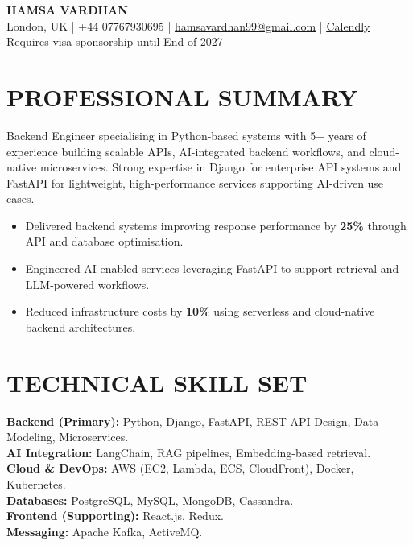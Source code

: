 \documentclass[11pt]{article}
\begin{document}
\begin{center}
{\LARGE \textbf{HAMSA VARDHAN}}\\
London, UK \;|\; +44 07767930695 \;|\;
\href{mailto:hamsavardhan99@gmail.com}{hamsavardhan99@gmail.com} \;|\; \href{https://calendly.com/hamsa-vd/intro-call}{\underline{Calendly}} \\
{\small Requires visa sponsorship until End of 2027}
\end{center}

\section*{PROFESSIONAL SUMMARY}

Backend Engineer specialising in Python-based systems with 5+ years of experience building scalable APIs, AI-integrated backend workflows, and cloud-native microservices. Strong expertise in Django for enterprise API systems and FastAPI for lightweight, high-performance services supporting AI-driven use cases.

\begin{itemize}
    \item Delivered backend systems improving response performance by \textbf{25\%} through API and database optimisation.
    \item Engineered AI-enabled services leveraging FastAPI to support retrieval and LLM-powered workflows.
    \item Reduced infrastructure costs by \textbf{10\%} using serverless and cloud-native backend architectures.
\end{itemize}

\section*{TECHNICAL SKILL SET}

\textbf{Backend (Primary):} Python, Django, FastAPI, REST API Design, Data Modeling, Microservices.\\
\textbf{AI Integration:} LangChain, RAG pipelines, Embedding-based retrieval.\\
\textbf{Cloud \& DevOps:} AWS (EC2, Lambda, ECS, CloudFront), Docker, Kubernetes.\\
\textbf{Databases:} PostgreSQL, MySQL, MongoDB, Cassandra.\\
\textbf{Frontend (Supporting):} React.js, Redux.\\
\textbf{Messaging:} Apache Kafka, ActiveMQ.
\end{document}
